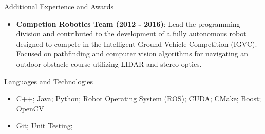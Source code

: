 \documentclass[]{mcdowellcv}
\begin{document}
    \begin{cvsection}{Additional Experience and Awards}
        \begin{cvsubsection}{}{}{}  
            \begin{itemize} 
                \item \textbf{Competion Robotics Team (2012 - 2016)}: Lead the programming division and contributed to the development of a fully autonomous robot designed to compete in the Intelligent Ground Vehicle Competition (IGVC). Focused on pathfinding and computer vision algorithms for navigating an outdoor obstacle course utilizing LIDAR and stereo optics.
            \end{itemize}
        \end{cvsubsection}
    \end{cvsection}
    
    \begin{cvsection}{Languages and Technologies}
        \begin{cvsubsection}{}{}{}  
            \begin{itemize}
                \item C++; Java; Python; Robot Operating System (ROS); CUDA; CMake; Boost; OpenCV 
                \item Git; Unit Testing;
            \end{itemize}
        \end{cvsubsection}
    \end{cvsection}
    
\end{document}
